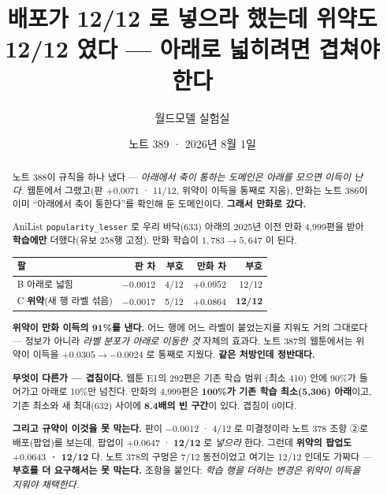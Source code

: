 \documentclass[11pt]{article}
\begin{document}
\title{배포가 12/12 로 넣으라 했는데 위약도 12/12 였다 --- 아래로 넓히려면 겹쳐야 한다}
\author{월드모델 실험실}
\date{노트 389 · 2026년 8월 1일}
\maketitle

\begin{abstract}
노트 388이 규칙을 하나 냈다 --- \emph{아래에서 축이 통하는 도메인은 아래를
모으면 이득이 난다.} 웹툰에서 그랬고(판 $+0.0071$ · 11/12, 위약이 이득을
통째로 지움), 만화는 노트 386이 이미 ``아래에서 축이 통한다''를 확인해 둔
도메인이다. \textbf{그래서 만화로 갔다.}

AniList \texttt{popularity\_lesser} 로 우리 바닥(633) 아래의 2025년 이전
만화 4,999편을 받아 \textbf{학습에만} 더했다(유보 258행 고정). 만화 학습이
$1{,}783 \to 5{,}647$ 이 된다.

\begin{center}
\begin{tabular}{lrrrr}
\hline
팔 & 판 차 & 부호 & 만화 차 & 부호 \\
\hline
B 아래로 넓힘 & $-0.0012$ & 4/12 & $+0.0952$ & 12/12 \\
C \textbf{위약}(새 행 라벨 섞음) & $-0.0017$ & 5/12 & $\mathbf{+0.0864}$ & \textbf{12/12} \\
\hline
\end{tabular}
\end{center}

\textbf{위약이 만화 이득의 91\%를 낸다.} 어느 행에 어느 라벨이 붙었는지를
지워도 거의 그대로다 --- 정보가 아니라 \emph{라벨 분포가 아래로 이동한
것} 자체의 효과다. 노트 387의 웹툰에서는 위약이 이득을 $+0.0305 \to
-0.0024$ 로 통째로 지웠다. \textbf{같은 처방인데 정반대다.}

\textbf{무엇이 다른가 --- 겹침이다.} 웹툰 E1의 292편은 기존 학습 범위
(최소 410) 안에 90\%가 들어가고 아래로 10\%만 넘친다. 만화의 4,999편은
\textbf{100\%가 기존 학습 최소(5,306) 아래}이고, 기존 최소와 새 최대(632)
사이에 \textbf{8.4배의 빈 구간}이 있다. 겹침이 0이다.

\textbf{그리고 규약이 이것을 못 막는다.} 판이 $-0.0012$ · 4/12 로
미결정이라 노트 378 조항 ②로 배포(팝업)를 보는데, 팝업이
$\mathbf{+0.0647}$ · \textbf{12/12} 로 \emph{넣으라} 한다. 그런데
\textbf{위약의 팝업도 $+0.0643$ · 12/12} 다. 노트 378의 구멍은 7/12
동전이었고 여기는 12/12 인데도 가짜다 --- \textbf{부호를 더 요구해서는
못 막는다.} 조항을 붙인다: \emph{학습 행을 더하는 변경은 위약이 이득을
지워야 채택한다.}
\end{abstract}
\end{document}

